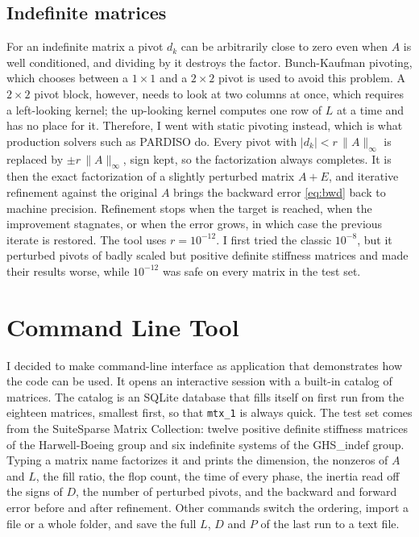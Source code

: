 \documentclass[conference]{IEEEtran}
\begin{document}
\subsection{Indefinite matrices}\label{sec:indef}
For an indefinite matrix a pivot $d_k$ can be arbitrarily close to zero even when $A$ is well conditioned, and dividing by it destroys the factor. Bunch-Kaufman pivoting\cite{b7}, which chooses between a $1\times1$ and a $2\times2$ pivot is used to avoid this problem. A $2\times2$ pivot block, however, needs to look at two columns at once, which requires a left-looking kernel; the up-looking kernel computes one row of $L$ at a time and has no place for it. Therefore, I went with static pivoting instead, which is what production solvers such as PARDISO do\cite{b10}. Every pivot with $|d_k| < r\,\|A\|_\infty$ is replaced by $\pm r\,\|A\|_\infty$, sign kept, so the factorization always completes. It is then the exact factorization of a slightly perturbed matrix $A+E$, and iterative refinement against the original $A$ brings the backward error \eqref{eq:bwd} back to machine precision. Refinement stops when the target is reached, when the improvement stagnates, or when the error grows, in which case the previous iterate is restored. The tool uses $r=10^{-12}$. I first tried the classic $10^{-8}$, but it perturbed pivots of badly scaled but positive definite stiffness matrices and made their results worse, while $10^{-12}$ was safe on every matrix in the test set.

\section{Command Line Tool}
I decided to make command-line interface as application that demonstrates how the code can be used. It opens an interactive session with a built-in catalog of matrices. The catalog is an SQLite\cite{b11} database that fills itself on first run from the eighteen matrices, smallest first, so that \texttt{mtx\_1} is always quick. The test set comes from the SuiteSparse Matrix Collection\cite{b12}: twelve positive definite stiffness matrices of the Harwell-Boeing group and six indefinite systems of the GHS\_indef group. Typing a matrix name factorizes it and prints the dimension, the nonzeros of $A$ and $L$, the fill ratio, the flop count, the time of every phase, the inertia read off the signs of $D$, the number of perturbed pivots, and the backward and forward error before and after refinement. Other commands switch the ordering, import a file or a whole folder, and save the full $L$, $D$ and $P$ of the last run to a text file.
\end{document}
